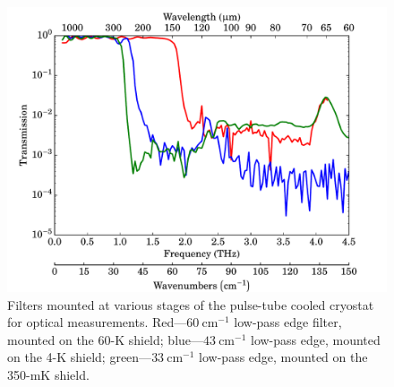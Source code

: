 \begin{figure}[tb]
\begin{center}
\includegraphics[width = 1.0\textwidth]{figures/AloysiusFilters}
\caption[Filters used for optical measurement in the pulse-tube cooled cryostat]{Filters mounted at various stages of the pulse-tube cooled cryostat for optical measurements. Red---$60~\mathrm{cm}^{-1}$ low-pass edge filter, mounted on the 60-K shield; blue---$43~\mathrm{cm}^{-1}$ low-pass edge, mounted on the 4-K shield; green---$33~\mathrm{cm}^{-1}$ low-pass edge, mounted on the 350-mK shield.}
\label{fig:AloysiusFilters}
\end{center}
\end{figure}
\par 
